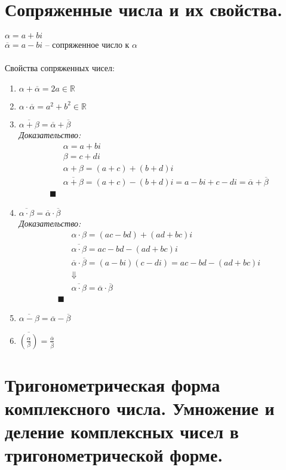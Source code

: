 \documentclass[12pt, fleqn]{article}
\begin{document}
\section{Сопряженные числа и их свойства.}
$\alpha=a+bi$\\
$\overline{\alpha}=a-bi$ -- сопряженное число к $\alpha$\\\\
Свойства сопряженных чисел:
\begin{enumerate}
	\item $\alpha+\overline{\alpha}=2a\in\mathbb{R}$
	\item $\alpha \cdot\overline{\alpha}=a^2+b^2\in\mathbb{R}$
	\item $\overline{\alpha+\beta}=\overline{\alpha}+\overline{\beta}$\\
	\textit{Доказательство:}
	\begin{align*}
	&\alpha = a+bi&\\
	&\beta = c+di&\\
	&\alpha + \beta = (a+c) + (b+d)i&\\
	&\overline{\alpha+\beta}=(a+c)-(b+d)i=a-bi+c-di=\overline{\alpha}+\overline{\beta}&\\
	\blacksquare
	\end{align*}
	\item$\overline{\alpha\cdot\beta}=\overline{\alpha}\cdot\overline{\beta}$\\
	\textit{Доказательство:}
	\begin{align*}
		&\alpha\cdot\beta=(ac-bd)+(ad+bc)i&\\
		&\overline{\alpha\cdot\beta}=ac-bd-(ad+bc)i&\\
		&\overline{\alpha}\cdot\overline{\beta}=(a-bi)(c-di)=ac-bd-(ad+bc)i&\\
		&\Downarrow&\\
		&\overline{\alpha\cdot\beta}=\overline{\alpha}\cdot\overline{\beta}&\\
		\blacksquare
	\end{align*}
	\item $\overline{\alpha-\beta}=\overline{\alpha}-\overline{\beta}$
	\item $\overline{\left(\frac\alpha\beta\right)} =\frac{\overline{\alpha}}{\overline{\beta}}$
\end{enumerate}

\section{Тригонометрическая форма комплексного числа. Умножение и деление комплексных чисел в тригонометрической форме.}
\end{document}
